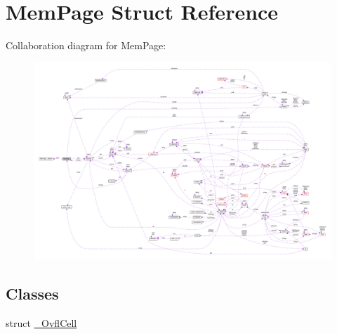 \hypertarget{struct_mem_page}{\section{Mem\-Page Struct Reference}
\label{struct_mem_page}
}


Collaboration diagram for Mem\-Page\-:\nopagebreak
\begin{figure}[H]
\begin{center}
\leavevmode
\includegraphics[width=350pt]{struct_mem_page__coll__graph}
\end{center}
\end{figure}
\subsection*{Classes}
\begin{DoxyCompactItemize}
\item 
struct \hyperlink{struct_mem_page_1_1___ovfl_cell}{\-\_\-\-Ovfl\-Cell}
\end{DoxyCompactItemize}
